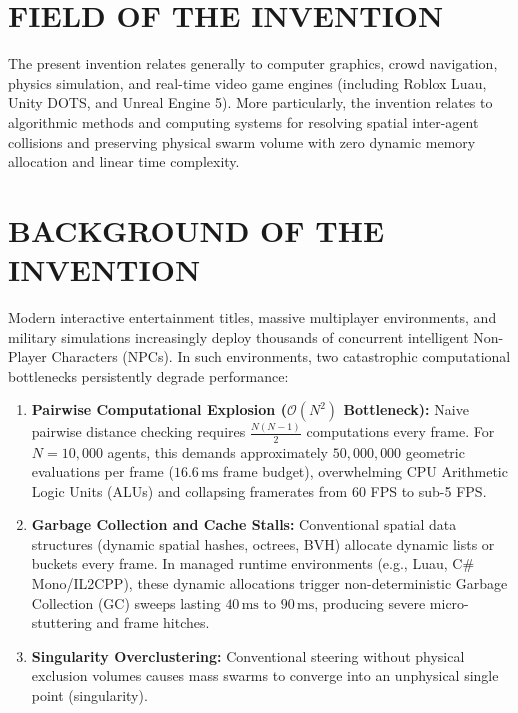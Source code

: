 \documentclass[11pt,a4paper]{article}
\begin{document}
\section*{FIELD OF THE INVENTION}
The present invention relates generally to computer graphics, crowd navigation, physics simulation, and real-time video game engines (including Roblox Luau, Unity DOTS, and Unreal Engine 5). More particularly, the invention relates to algorithmic methods and computing systems for resolving spatial inter-agent collisions and preserving physical swarm volume with zero dynamic memory allocation and linear time complexity.

\section*{BACKGROUND OF THE INVENTION}
Modern interactive entertainment titles, massive multiplayer environments, and military simulations increasingly deploy thousands of concurrent intelligent Non-Player Characters (NPCs). In such environments, two catastrophic computational bottlenecks persistently degrade performance:
\begin{enumerate}
    \item \textbf{Pairwise Computational Explosion ($\mathcal{O}(N^2)$ Bottleneck):} Naive pairwise distance checking requires $\frac{N(N-1)}{2}$ computations every frame. For $N = 10,000$ agents, this demands approximately $50,000,000$ geometric evaluations per frame ($16.6\,\text{ms}$ frame budget), overwhelming CPU Arithmetic Logic Units (ALUs) and collapsing framerates from 60 FPS to sub-5 FPS.
    \item \textbf{Garbage Collection and Cache Stalls:} Conventional spatial data structures (dynamic spatial hashes, octrees, BVH) allocate dynamic lists or buckets every frame. In managed runtime environments (e.g., Luau, C\# Mono/IL2CPP), these dynamic allocations trigger non-deterministic Garbage Collection (GC) sweeps lasting $40\,\text{ms}$ to $90\,\text{ms}$, producing severe micro-stuttering and frame hitches.
    \item \textbf{Singularity Overclustering:} Conventional steering without physical exclusion volumes causes mass swarms to converge into an unphysical single point (singularity).
\end{enumerate}
\end{document}
